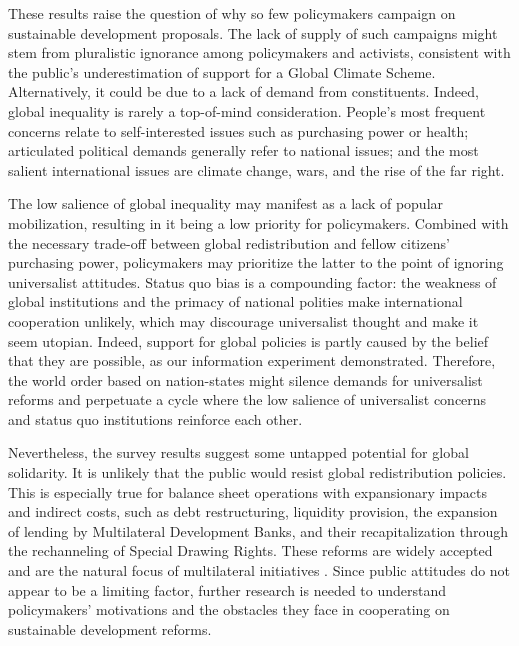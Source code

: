 \documentclass[12pt,english]{article}
\begin{document}
\begin{bibunit}
These results raise the question of why so few policymakers campaign on sustainable development proposals. The lack of supply of such campaigns might stem from pluralistic ignorance among policymakers and activists, consistent with the public's underestimation of support for a Global Climate Scheme.
Alternatively, it could be due to a lack of demand from constituents. Indeed, global inequality is rarely a top-of-mind consideration. People's most frequent concerns relate to self-interested issues such as purchasing power or health; articulated political demands generally refer to national issues; and the most salient international issues are climate change, wars, and the rise of the far right.

The low salience of global inequality may manifest as a lack of popular mobilization, resulting in it being a low priority for policymakers. Combined with the necessary trade-off between global redistribution and fellow citizens' purchasing power, policymakers may prioritize the latter to the point of ignoring universalist attitudes.
Status quo bias is a compounding factor: the weakness of global institutions and the primacy of national polities make international cooperation unlikely, which may discourage universalist thought and make it seem utopian.
Indeed, support for global policies is partly caused by the belief that they are possible, as our information experiment demonstrated. Therefore, the world order based on nation-states might silence demands for universalist reforms and perpetuate a cycle where the low salience of universalist concerns and status quo institutions reinforce each other.

Nevertheless, the survey results
suggest some untapped potential for global solidarity. It is unlikely that the public would resist global redistribution policies. This is especially true for balance sheet operations with expansionary impacts and indirect costs, such as debt restructuring, liquidity provision,
the expansion of lending by Multilateral Development Banks, and their recapitalization through the rechanneling of Special Drawing Rights. These reforms are widely accepted and are the natural focus of multilateral initiatives \citep{bridgetown_initiative_bridgetown_2025,ffd4_outcome_2025}.
Since public attitudes do not appear to be a limiting factor, further research is needed to understand policymakers' motivations and the obstacles they face in cooperating on sustainable development reforms.

\renewcommand{\url}[1]{\href{#1}{Link}}

\clearpage

\putbib
\end{bibunit}
\end{document}
